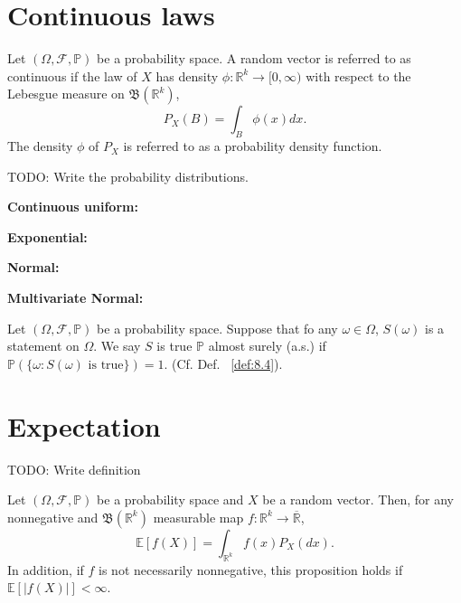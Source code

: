 \section{Continuous laws}%
\label{sec:Continuous laws}
\begin{definition}
    \label{def:10.6}
    Let $(\Omega, \mathcal{F}, \mathbb{P})$ be a probability space. A random vector is referred 
    to as continuous if the law of $X$ has density $\phi: \mathbb{R}^{k}\to [0, \infty)$ with 
    respect to the Lebesgue measure on $\mathfrak{B}(\mathbb{R}^{k})$,
    \[
    P_X(B)= \int_{B} \phi(x)dx
    .\] 
    The density $\phi$ of $P_X$ is referred to as a probability density function.
\end{definition}

\begin{myexample}
    \label{myex:10.2}
    TODO: Write the probability distributions.

    \textbf{Continuous uniform:}

    \textbf{Exponential:}

    \textbf{Normal:}

    \textbf{Multivariate Normal:}
\end{myexample}

\begin{definition}[]
    \label{def:10.7}
    Let $(\Omega, \mathcal{F}, \mathbb{P})$ be a probability space. Suppose that fo any $\omega \in \Omega$,
    $S(\omega)$ is a statement on $\Omega$. We say $S$ is true $\mathbb{P}$ almost surely (a.s.) if 
    $\mathbb{P}(\{\omega: S(\omega) \text{ is true}\} )=1$. (Cf. Def. ~\ref{def:8.4}).
    
\end{definition}

\section{Expectation}%
\label{sec:Expectation}
\begin{definition}[Expectation of $X$]
    \label{def:10.9}
    TODO: Write definition
\end{definition}

\begin{proposition}[Expectation of $f(X)$]
    \label{prop:10.3}
    Let $(\Omega, \mathcal{F}, \mathbb{P})$ be a probability space and $X$ be a random vector.
    Then, for any nonnegative and $\mathfrak{B}(\mathbb{R}^{k})$ measurable map $f: \mathbb{R}^{k}\to 
    \overline{\mathbb{R}}$,
    \[
    \mathbb{E}[f(X)]= \int_{\mathbb{R}^{k}} f(x)P_X(dx)
    .\] 
    In addition, if $f$ is not necessarily nonnegative, this proposition holds if $\mathbb{E}[|f(X)|]<\infty$.
\end{proposition}

